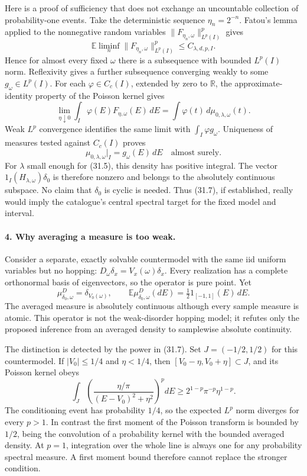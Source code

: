 \documentclass[11pt]{article}
\begin{document}
Here is a proof of sufficiency that does not exchange an uncountable
collection of probability-one events. Take the deterministic sequence
$\eta_n=2^{-n}$. Fatou's lemma applied to the nonnegative random variables
$\|F_{\eta_n,\omega}\|_{L^p(I)}^p$ gives
\[
 \mathbb E\liminf_n\|F_{\eta_n,\omega}\|_{L^p(I)}^p\leq C_{\lambda,d,p,I}.
\]
Hence for almost every fixed $\omega$ there is a subsequence with bounded
$L^p(I)$ norm. Reflexivity gives a further subsequence converging weakly
to some $g_\omega\in L^p(I)$. For each $\varphi\in C_c(I)$, extended by
zero to $\mathbb R$, the approximate-identity property of the Poisson
kernel gives
\[
 \lim_{\eta\downarrow0}\int_I\varphi(E)F_{\eta,\omega}(E)\,dE
    =\int\varphi(t)\,d\mu_{0,\lambda,\omega}(t).
\]
Weak $L^p$ convergence identifies the same limit with
$\int_I\varphi g_\omega$. Uniqueness of measures tested against
$C_c(I)$ proves
\[
 \mu_{0,\lambda,\omega}|_I=g_\omega(E)\,dE
 \quad\text{almost surely}.
 \tag{31.8}
\]
For $\lambda$ small enough for (31.5), this density has positive integral.
The vector $1_I(H_{\lambda,\omega})\delta_0$ is therefore nonzero and
belongs to the absolutely continuous subspace. No claim that $\delta_0$
is cyclic is needed. Thus (31.7), if established, really would imply the
catalogue's central spectral target for the fixed model and interval.

\paragraph{4. Why averaging a measure is too weak.}
Consider a separate, exactly solvable countermodel with the same iid
uniform variables but no hopping:
$D_\omega\delta_x=V_x(\omega)\delta_x$. Every realization has a complete
orthonormal basis of eigenvectors, so the operator is pure point. Yet
\[
 \mu^{D}_{\delta_0,\omega}=\delta_{V_0(\omega)},\qquad
 \mathbb E\mu^{D}_{\delta_0,\omega}(dE)
       =\tfrac12 1_{[-1,1]}(E)\,dE.
 \tag{31.9}
\]
The averaged measure is absolutely continuous although every sample measure
is atomic. This operator is not the weak-disorder hopping model; it refutes
only the proposed inference from an averaged density to samplewise absolute
continuity.

The distinction is detected by the power in (31.7). Set $J=(-1/2,1/2)$
for this countermodel. If $|V_0|\leq1/4$ and $\eta<1/4$, then
$[V_0-\eta,V_0+\eta]\subset J$, and its Poisson kernel obeys
\[
 \int_J\left(\frac{\eta/\pi}{(E-V_0)^2+\eta^2}\right)^p dE
 \geq 2^{1-p}\pi^{-p}\eta^{1-p}.
 \tag{31.10}
\]
The conditioning event has probability $1/4$, so the expected $L^p$ norm
diverges for every $p>1$. In contrast the first moment of the Poisson
transform is bounded by $1/2$, being the convolution of a probability
kernel with the bounded averaged density. At $p=1$, integration over the
whole line is always one for any probability spectral measure. A first
moment bound therefore cannot replace the stronger condition.
\end{document}
